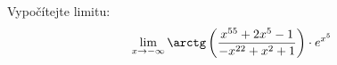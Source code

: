 
    Vypočítejte limitu:
    \begin{align*}
    \lim_{ x \rightarrow -\infty } \arctg \left( \frac{ x^{ 55 } + 2x^{ 5 } - 1 }{ - x^{ 22 } + x^{ 2 } + 1  } \right) \cdot e^{ x^{5} }
    \end{align*}
    
